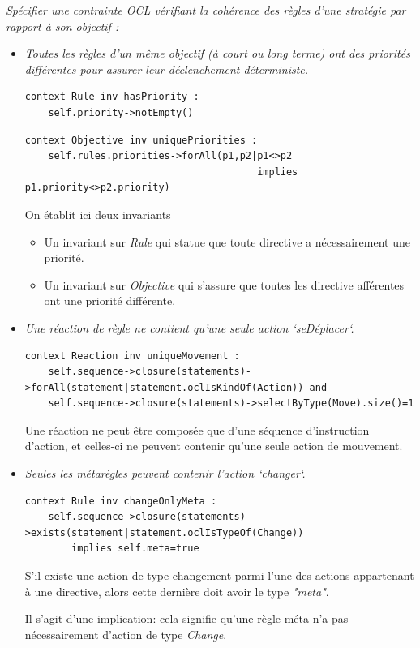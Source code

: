 \documentclass[oneside,a4paper]{book}
\begin{document}
\textit{Spécifier une contrainte OCL vérifiant la cohérence des règles d'une stratégie par rapport à son objectif :}
\begin{itemize}
    \item \textit{Toutes les règles d'un même objectif (à court ou long terme) ont des priorités différentes pour assurer leur déclenchement déterministe.}
        \begin{lstlisting}
context Rule inv hasPriority : 
    self.priority->notEmpty()
    \end{lstlisting}
    \begin{lstlisting}
context Objective inv uniquePriorities : 
    self.rules.priorities->forAll(p1,p2|p1<>p2 
                                        implies p1.priority<>p2.priority)
        \end{lstlisting}
        On établit ici deux invariants
        \begin{itemize}
            \item Un invariant sur \textit{Rule} qui statue que toute directive a nécessairement une priorité.
            \item Un invariant sur \textit{Objective} qui s'assure que toutes les directive afférentes ont une priorité différente.
        \end{itemize}
        
    \item \textit{Une réaction de règle ne contient qu'une seule action `seDéplacer`.}
        \begin{lstlisting}
context Reaction inv uniqueMovement : 
    self.sequence->closure(statements)->forAll(statement|statement.oclIsKindOf(Action)) and 
    self.sequence->closure(statements)->selectByType(Move).size()=1
        \end{lstlisting}
        Une réaction ne peut être composée que d'une séquence d'instruction d'action, et celles-ci ne peuvent contenir qu'une seule action de mouvement.

    \item \textit{Seules les métarègles peuvent contenir l'action `changer`.}
        \begin{lstlisting}
context Rule inv changeOnlyMeta : 
    self.sequence->closure(statements)->exists(statement|statement.oclIsTypeOf(Change))
        implies self.meta=true
        \end{lstlisting}
        S'il existe une action de type changement parmi l'une des actions appartenant à une directive, alors cette dernière doit avoir le type \textit{"meta"}.
        \begin{tcolorbox}
            Il s'agit d'une implication: cela signifie qu'une règle méta n'a pas nécessairement d'action de type \textit{Change}.
        \end{tcolorbox}

\end{itemize}
\end{document}
